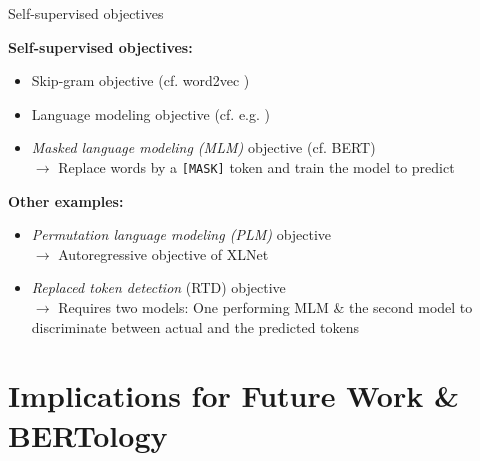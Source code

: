 
\begin{frame}{Self-supervised objectives}

\vfill

\textbf{Self-supervised objectives:}
	
	\begin{itemize}
		\item Skip-gram objective (cf. word2vec )
		\item Language modeling objective (cf. e.g. )
		\item \textit{Masked language modeling (MLM)} objective (cf. BERT)\\
					$\rightarrow$ Replace words by a \texttt{[MASK]} token and train the model to predict
	\end{itemize}
	
\textbf{Other examples:}
	
	\begin{itemize}
		\item \textit{Permutation language modeling (PLM)} objective \\
					$\rightarrow$ Autoregressive objective of XLNet
		\item \textit{Replaced token detection} (RTD) objective \\
					$\rightarrow$ Requires two models: One performing MLM \& the second model to discriminate between actual and the predicted tokens
	\end{itemize}
	
\vfill

\end{frame}



\section{Implications for Future Work \& BERTology}

